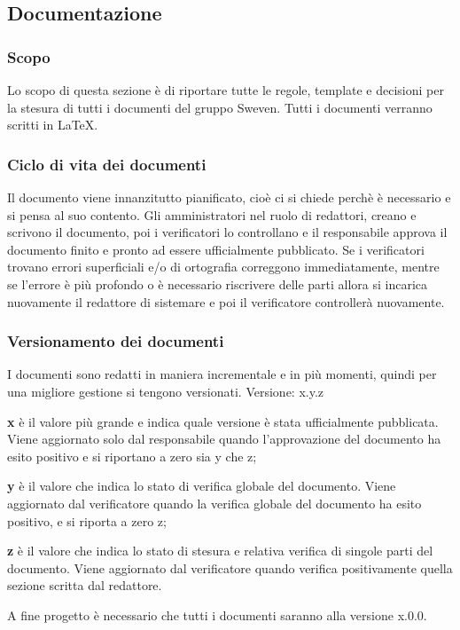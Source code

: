 \subsection{Documentazione}
\subsubsection{Scopo}
Lo scopo di questa sezione è di riportare tutte le regole, template e decisioni 
per la stesura di tutti i documenti del gruppo Sweven. \newline
Tutti i documenti verranno scritti in \LaTeX.

\subsubsection{Ciclo di vita dei documenti}
Il documento viene innanzitutto pianificato, cioè ci si chiede perchè è necessario e si pensa al suo contento. Gli amministratori nel ruolo di redattori, creano e scrivono 
il documento, poi i verificatori lo controllano e il responsabile approva il documento 
finito e pronto ad essere ufficialmente pubblicato. \newline
Se i verificatori trovano errori superficiali e/o di ortografia correggono immediatamente,
mentre se l'errore è più profondo o è necessario riscrivere delle parti allora si
incarica nuovamente il redattore di sistemare e poi il verificatore controllerà nuovamente.

\subsubsection{Versionamento dei documenti}
I documenti sono redatti in maniera incrementale e in più momenti, quindi per una migliore 
gestione si tengono versionati.
\newline Versione: x.y.z
\begin{description}
    \item \textbf{x} è il valore più grande e indica quale versione è stata ufficialmente pubblicata.
            Viene aggiornato solo dal responsabile quando l'approvazione del documento ha esito positivo
            e si riportano a zero sia y che z;
    \item \textbf{y} è il valore che indica lo stato di verifica globale del documento. Viene aggiornato dal verificatore 
            quando la verifica globale del documento ha esito positivo, e si riporta a zero z;
    \item \textbf{z} è il valore che indica lo stato di stesura e relativa verifica di singole parti del documento. 
            Viene aggiornato dal verificatore quando verifica positivamente quella sezione scritta dal redattore.
\end{description}
A fine progetto è necessario che tutti i documenti saranno alla versione x.0.0.


